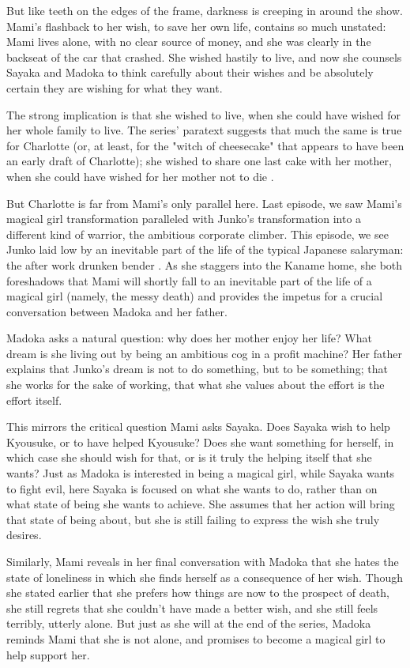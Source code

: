 But like teeth on the edges of the frame, darkness is creeping in around the show. Mami's flashback to her wish, to save her own life, contains so much unstated: Mami lives alone, with no clear source of money, and she was clearly in the backseat of the car that crashed. She wished hastily to live, and now she counsels Sayaka and Madoka to think carefully about their wishes and be absolutely certain they are wishing for what they want.

The strong implication is that she wished to live, when she could have wished for her whole family to live. The series' paratext suggests that much the same is true for Charlotte (or, at least, for the "witch of cheesecake" that appears to have been an early draft of Charlotte); she wished to share one last cake with her mother, when she could have wished for her mother not to die \cite{ref34}. 

But Charlotte is far from Mami's only parallel here. Last episode, we saw Mami's magical girl transformation paralleled with Junko's transformation into a different kind of warrior, the ambitious corporate climber. This episode, we see Junko laid low by an inevitable part of the life of the typical Japanese salaryman: the after work drunken bender \cite{ref35}. As she staggers into the Kaname home, she both foreshadows that Mami will shortly fall to an inevitable part of the life of a magical girl (namely, the messy death) and provides the impetus for a crucial conversation between Madoka and her father.

Madoka asks a natural question: why does her mother enjoy her life? What dream is she living out by being an ambitious cog in a profit machine? Her father explains that Junko's dream is not to do something, but to be something; that she works for the sake of working, that what she values about the effort is the effort itself. 

This mirrors the critical question Mami asks Sayaka. Does Sayaka wish to help Kyousuke, or to have helped Kyousuke? Does she want something for herself, in which case she should wish for that, or is it truly the helping itself that she wants? Just as Madoka is interested in being a magical girl, while Sayaka wants to fight evil, here Sayaka is focused on what she wants to do, rather than on what state of being she wants to achieve. She assumes that her action will bring that state of being about, but she is still failing to express the wish she truly desires. 

Similarly, Mami reveals in her final conversation with Madoka that she hates the state of loneliness in which she finds herself as a consequence of her wish. Though she stated earlier that she prefers how things are now to the prospect of death, she still regrets that she couldn't have made a better wish, and she still feels terribly, utterly alone. But just as she will at the end of the series, Madoka reminds Mami that she is not alone, and promises to become a magical girl to help support her. 

